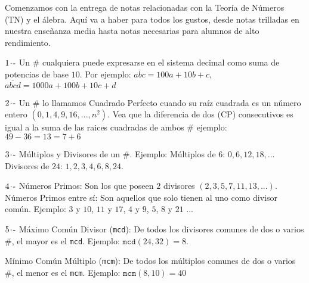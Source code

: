 Comenzamos con la entrega de notas relacionadas con la Teoría de Números (TN) y el álebra. Aquí va a haber para todos los gustos, desde notas trilladas en nuestra enseñanza media hasta notas necesarias para alumnos de alto rendimiento.

\vspace{0.5cm}

$1\hspace{-0.05cm}\cdot\hspace{-0.05cm}\text{-}$ Un \# cualquiera puede expresarse en el sistema decimal como suma de potencias de base $10$. Por ejemplo: $\overline{abc}=100a + 10b + c$, $\overline{abcd}= 1000a + 100b + 10c + d$

\vspace{0.5cm}

$2\hspace{-0.05cm}\cdot\hspace{-0.05cm}\text{-}$ Un \# lo llamamos Cuadrado Perfecto cuando su raíz cuadrada es un número entero $(0, 1, 4, 9, 16, ..., n^2)$. Vea que la diferencia de dos (CP) consecutivos es igual a la suma de las raices cuadradas de ambos \# ejemplo: $49-36=13=7+6$

\vspace{0.5cm}

$3\hspace{-0.05cm}\cdot\hspace{-0.05cm}\text{-}$ Múltiplos y Divisores de un \#. Ejemplo: Múltiplos de $6$: $0,6,12,18,...$ Divisores de $24$: $1, 2, 3, 4, 6, 8, 24$.

\vspace{0.5cm}

$4\hspace{-0.05cm}\cdot\hspace{-0.05cm}\text{-}$ Números Primos: Son los que poseen $2$ divisores $(2,3,5,7,11,13,...)$. Números Primos entre sí: Son aquellos que solo tienen al uno como divisor común. Ejemplo: $3$ y $10$, $11$ y $17$, $4$ y $9$, $5$, $8$ y $21$ ... 

\vspace{0.5cm}

$5\hspace{-0.05cm}\cdot\hspace{-0.05cm}\text{-}$ Máximo Común Divisor (\texttt{mcd}): De todos los divisores comunes de dos o varios \#, el mayor es el \texttt{mcd}. Ejemplo: $\texttt{mcd}(24,32)=8$.

Mínimo Común Múltiplo (\texttt{mcm}): De todos los múltiplos comunes de dos o varios \#, el menor es el \texttt{mcm}. Ejemplo: $\texttt{mcm}(8,10)=40$

